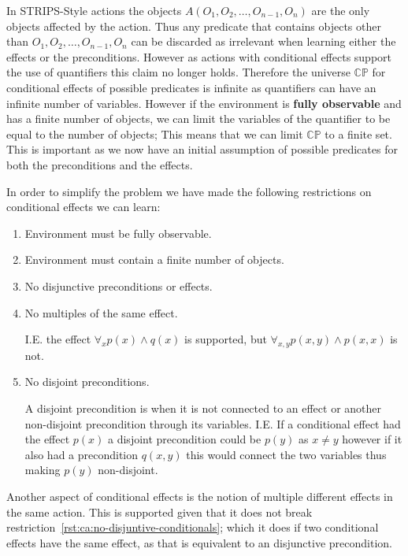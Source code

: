 \documentclass[../Master.tex]{subfiles}
\begin{document}
In STRIPS-Style actions the objects $A(O_1,O_2,\ldots,O_{n-1},O_n)$ are the only objects affected by the action.
Thus any predicate that contains objects other than $O_1,O_2,\ldots,O_{n-1},O_n$ can be discarded as irrelevant when learning either the effects or the preconditions.
However as actions with conditional effects support the use of quantifiers this claim no longer holds.
Therefore the universe $\mathbb{CP}$ for conditional effects of possible predicates is infinite as quantifiers can have an infinite number of variables.
However if the environment is \textbf{fully observable} and has a finite number of objects,
we can limit the variables of the quantifier to be equal to the number of objects; This means that we can limit $\mathbb{CP}$ to a finite set.
This is important as we now have an initial assumption of possible predicates for both the preconditions and the effects.

In order to simplify the problem we have made the following restrictions on conditional effects we can learn:
\begin{enumerate}
	\item Environment must be fully observable.
	\item Environment must contain a finite number of objects.
	\item \label{rst:ca:no-disjuntive-conditionals} No disjunctive preconditions or effects.
	\item \label{rst:ca:no-multiple-effect} No multiples of the same effect.

		  I.E. the effect $\forall_x p(x) \land q(x)$ is supported, but $\forall_{x, y} p(x, y) \land p(x, x) $ is not.

	\item \label{rst:ca:no-disjoint-preconditions} No disjoint preconditions.

		  A disjoint precondition is when it is not connected to an effect or another non-disjoint precondition through its variables.
		  I.E. If a conditional effect had the effect $p(x)$ a disjoint precondition could be $p(y)$ as $x \neq y$ however if it also had a precondition $q(x,y)$ this would connect the two variables thus making $p(y)$ non-disjoint.
\end{enumerate}

Another aspect of conditional effects is the notion of multiple different effects in the same action. This is supported given that it does not break restriction~\ref{rst:ca:no-disjuntive-conditionals}; which it does if two conditional effects have the same effect, as that is equivalent to an disjunctive precondition.
\end{document}
